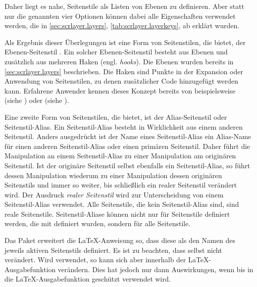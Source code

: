 Daher liegt es nahe, Seitenstile als Listen von Ebenen zu definieren. Aber
statt nur die genannten vier Optionen können dabei alle Eigenschaften
verwendet werden, die in \autoref{sec:scrlayer.layers},
\autoref{tab:scrlayer.layerkeys}, ab 
erklärt wurden.

Als Ergebnis dieser Überlegungen ist eine Form von Seitenstilen, die
 bietet, der Ebenen-Seitenstil%
. Ein
solcher Ebenen-Seitenstil besteht aus Ebenen und zusätzlich aus mehreren Haken
(engl. \emph{hooks}). Die Ebenen wurden bereits in
\autoref{sec:scrlayer.layers} beschrieben. Die
Haken sind Punkte in der Expansion
oder Anwendung von Seitenstilen, zu denen zusätzlicher Code hinzugefügt werden
kann. Erfahrene Anwender kennen dieses Konzept bereits von beispielsweise
 (siehe \cite{latex:usrguide}) oder
 (siehe
).

Eine zweite Form von Seitenstilen, die  bietet, ist der
Alias-Seitenstil%
 oder
Seitenstil-Alias. Ein Seitenstil-Alias besteht in Wirklichkeit aus einem
anderen Seitenstil. Anders ausgedrückt ist der Name eines Seitenstil-Alias ein
Alias-Name für einen anderen Seitenstil-Alias oder einen primären
Seitenstil. Daher führt die Manipulation an einem Seitenstil-Alias zu einer
Manipulation am originären Seitenstil. Ist der originäre Seitenstil selbst
ebenfalls ein Seitenstil-Alias, so führt dessen Manipulation wiederum zu einer
Manipulation dessen originären Seitenstils und immer so weiter, bis
schließlich ein realer Seitenstil verändert wird. Der Ausdruck \emph{realer
  Seitenstil} wird zur Unterscheidung von einem
Seitenstil-Alias verwendet. Alle Seitenstile, die kein Seitenstil-Alias sind,
sind reale Seitenstile. Seitenstil-Aliase können nicht nur für Seitenstile
definiert werden, die mit  definiert wurden, sondern für
alle Seitenstile.


\begin{Declaration}
\end{Declaration}
Das Paket  erweitert die \LaTeX-Anweisung
 so, dass diese
 als den Namen des jeweils aktiven Seitenstils
definiert. Es ist zu beachten, dass
 selbst
 nicht verändert. Wird
 verwendet, so kann sich
 aber innerhalb der \LaTeX-Ausgabefunktion
verändern. Dies hat jedoch nur dann Auswirkungen, wenn
 bis in die \LaTeX-Ausgabefunktion geschützt verwendet
wird.

